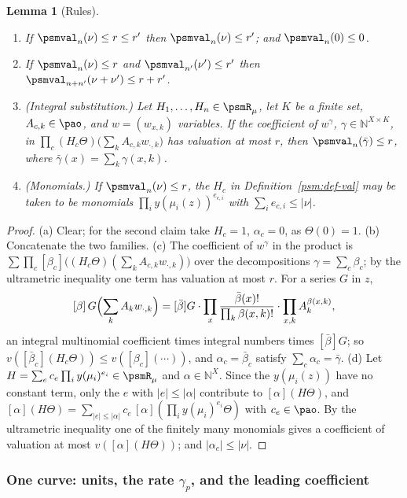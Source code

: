 \documentclass[10pt]{amsart}
\newtheorem{lemma}[theorem]{Lemma}
\theoremstyle{definition}
\theoremstyle{remark}
\newcommand{\N}{\mathbb N}
\begin{document}
\begin{lemma}[Rules]\label{psm:rules}
\begin{enumerate}
\item[(a)] If $\psmval_n(\nu)\le r\le r'$ then $\psmval_n(\nu)\le r'$; and $\psmval_n(0)\le0$.
\item[(b)] If $\psmval_n(\nu)\le r$ and $\psmval_{n'}(\nu')\le r'$ then $\psmval_{n+n'}(\nu+\nu')
\le r+r'$.
\item[(c)] \emph{(Integral substitution.)} Let $H_1,\dots,H_n\in\psmR_\mu$, let $K$ be a finite set,
$A_{c,k}\in\pao$, and $w=(w_{x,k})$ variables. If the coefficient of $w^\gamma$, $\gamma\in
\N^{X\times K}$, in $\prod_{c}(H_c\Theta)\bigl(\sum_kA_{c,k}w_{\cdot,k}\bigr)$ has valuation at
most $r$, then $\psmval_n(\bar\gamma)\le r$, where $\bar\gamma(x)=\sum_k\gamma(x,k)$.
\item[(d)] \emph{(Monomials.)} If $\psmval_n(\nu)\le r$, the $H_c$ in
Definition~\ref{psm:def-val} may be taken to be monomials $\prod_iy(\mu_i(z))^{e_{c,i}}$ with
$\sum_ie_{c,i}\le|\nu|$.
\end{enumerate}
\end{lemma}
\begin{proof}
(a) Clear; for the second claim take $H_c=1$, $\alpha_c=0$, as $\Theta(0)=1$. (b) Concatenate the
two families. (c) The coefficient of $w^\gamma$ in the product is $\sum\prod_c[\beta_c]\bigl((H_c
\Theta)(\sum_kA_{c,k}w_{\cdot,k})\bigr)$ over the decompositions $\gamma=\sum_c\beta_c$; by the
ultrametric inequality one term has valuation at most $r$. For a series $G$ in $z$,
\[
[\beta]\,G\Bigl(\sum_kA_kw_{\cdot,k}\Bigr)=[\bar\beta]G\cdot\prod_x\frac{\bar\beta(x)!}{\prod_k
\beta(x,k)!}\cdot\prod_{x,k}A_k^{\beta(x,k)} ,
\]
an integral multinomial coefficient times integral numbers times $[\bar\beta]G$; so
$v([\bar\beta_c](H_c\Theta))\le v([\beta_c](\cdots))$, and $\alpha_c=\bar\beta_c$ satisfy
$\sum_c\alpha_c=\bar\gamma$. (d) Let $H=\sum_ec_e\prod_iy(\mu_i)^{e_i}\in\psmR_\mu$ and $\alpha\in
\N^X$. Since the $y(\mu_i(z))$ have no constant term, only the $e$ with $|e|\le|\alpha|$ contribute
to $[\alpha](H\Theta)$, and $[\alpha](H\Theta)=\sum_{|e|\le|\alpha|}c_e\,[\alpha](\prod_iy(\mu_i)^{
e_i}\Theta)$ with $c_e\in\pao$. By the ultrametric inequality one of the finitely many monomials
gives a coefficient of valuation at most $v([\alpha](H\Theta))$; and $|\alpha_c|\le|\nu|$.
\end{proof}

\subsubsection{One curve: units, the rate $\gamma_p$, and the leading coefficient}\label{psm:ss-curve}
\end{document}
